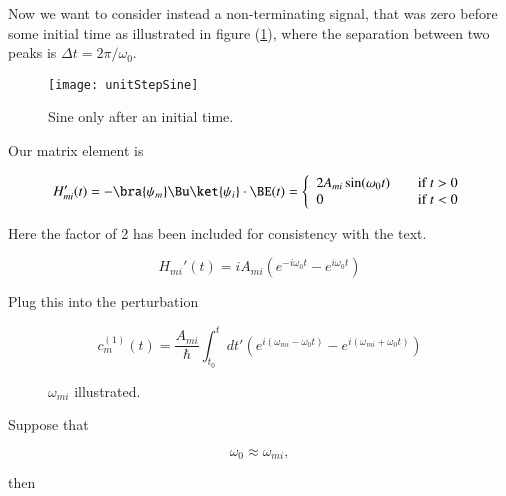 Now we want to consider instead a non-terminating signal, that was zero before some initial time as illustrated in figure (\ref{fig:unitStepSine}), where the separation between two peaks is $\Delta t = 2\pi/\omega_0$.

\begin{figure}[htp]
   \centering
   \texttt{[image: unitStepSine]}
   \caption{Sine only after an initial time.}\label{fig:unitStepSine}
\end{figure}

Our matrix element is 

\begin{equation}\label{eqn:qmTwoL9:470}
H_{mi}'(t) = - \bra{\psi_m} \Bu \ket{\psi_i} \cdot \BE(t) = 
\left\{
\begin{array}{l l}
2 A_{mi} \sin(\omega_0 t) & \quad \mbox{if $t > 0$} \\
0 & \quad \mbox{if $t < 0$} \\
\end{array}
\right.
\end{equation}

Here the factor of 2 has been included for consistency with the text.

\begin{equation}\label{eqn:qmTwoL9:490}
H_{mi}'(t) = i A_{mi} 
\left( 
e^{-i \omega_0 t}
-e^{i \omega_0 t} 
\right)
\end{equation}

Plug this into the perturbation

\begin{equation}\label{eqn:qmTwoL9:510}
c_m^{(1)}(t) = 
\frac{A_{mi}}{\hbar} \int_{t_0}^t dt' 
\left( 
e^{i (\omega_{mi} - \omega_0 t) }
-e^{i (\omega_{mi} + \omega_0 t) }
\right)
\end{equation}

\begin{figure}[htp]
   \centering
   \def\svgwidth{0.3\columnwidth}
   
   \caption{$\omega_{mi}$ illustrated.}\label{fig:qmTwoL9fig6}
\end{figure}

Suppose that

\begin{equation}\label{eqn:qmTwoL9:530}
\omega_0 \approx \omega_{mi},
\end{equation}

then

